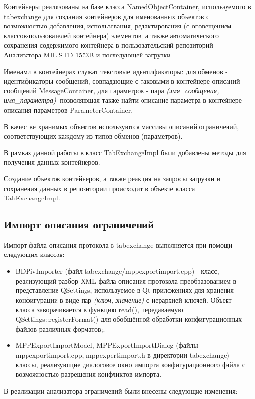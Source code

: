 Контейнеры реализованы на базе класса NamedObjectContainer, используемого в 
tabexchange для создания контейнеров для именованных объектов с возможностью 
добавления, использования, редактирования (с оповещением классов-пользователей 
контейнера) элементов, а также автоматического сохранения содержимого 
контейнера в пользовательский репозиторий Анализатора MIL STD-1553B и 
последующей 
загрузки.

Именами в контейнерах служат текстовые идентификаторы: для обменов - 
идентификаторы сообщений, совпадающие с таковыми в контейнере описаний 
сообщений MessageContainer, для параметров - пара \textit{(имя\_сообщения, 
имя\_параметра)}, позволяющая также найти описание параметра в 
контейнере описания параметров ParameterContainer.

В качестве хранимых объектов используются массивы описаний ограничений, 
соответствующих каждому из типов обменов (параметров).

В рамках данной работы в класс TabExchangeImpl были добавлены методы для 
получения данных контейнеров.

Создание объектов контейнеров, а также реакция на запросы загрузки и сохранения 
данных в репозитории происходит в объекте класса TabExchangeImpl.

\subsection{Импорт описания ограничений}

Импорт файла описания протокола в tabexchange выполняется при помощи следующих 
классов:

\begin{itemize}
 \item BDPivImporter (файл tabexchange/mppexportimport.cpp) - класс, 
реализующий разбор XML-файла описания протокола преобразованием в представление 
QSettings, используемое в Qt-приложениях для хранения конфигурации в виде пар 
\textit{(ключ, значение)} с иерархией ключей. Объект класса заворачивается в 
функцию read(), передаваемую QSettings::registerFormat() для обобщённой 
обработки конфигурационных файлов различных форматов;.
 \item MPPExportImportModel, MPPExportImportDialog (файлы 
mppexportimport.cpp, mppexportimport.h в директории tabexchange) - классы, 
реализующие диалоговое окно импорта конфигурационного файла с возможностью 
разрешения конфликтов импорта.
\end{itemize}

В реализации анализатора ограничений были внесены следующие изменения:

